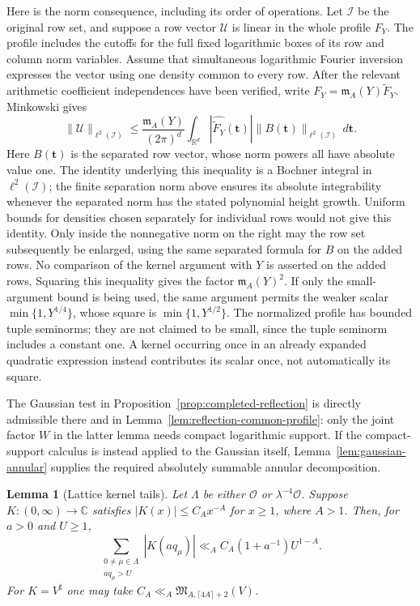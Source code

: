 \documentclass[11pt,a4paper]{article}
\numberwithin{equation}{section}
\numberwithin{figure}{section}
\newtheorem{lemma}[theorem]{Lemma}
\theoremstyle{definition}
\theoremstyle{remark}
\begin{document}
Here is the norm consequence, including its order of operations.  Let
$\mathcal I$ be the original row set, and suppose a row vector $\mathcal U$
is linear in the whole profile $F_Y$.  The profile includes the cutoffs for
the full fixed logarithmic boxes of its row and column norm variables.
Assume that simultaneous logarithmic Fourier inversion expresses the vector
using one density common to every row.  After the relevant arithmetic
coefficient independences have been verified, write
$F_Y=\mathfrak m_A(Y)\widetilde F_Y$.  Minkowski gives
\begin{equation}\label{eq:reflection-common-minkowski}
 \|\mathcal U\|_{\ell^2(\mathcal I)}
 \le \frac{\mathfrak m_A(Y)}{(2\pi)^d}
       \int_{\mathbb R^d}|\widehat{\widetilde F_Y}(\boldsymbol t)|
       \|B(\boldsymbol t)\|_{\ell^2(\mathcal I)}\,d\boldsymbol t.
\end{equation}
Here $B(\boldsymbol t)$ is the separated row vector, whose norm powers all
have absolute value one.  The identity underlying this inequality is a
Bochner integral in $\ell^2(\mathcal I)$; the finite separation norm above
ensures its absolute integrability whenever the separated norm has the stated
polynomial height growth.  Uniform bounds for densities chosen separately
for individual rows would not give this identity.
Only inside the nonnegative norm on the right may the row set subsequently
be enlarged, using the same separated formula for $B$ on the added rows.
No comparison of the kernel argument with $Y$ is asserted
on the added rows.  Squaring this inequality gives the factor
$\mathfrak m_A(Y)^2$.  If only the small-argument bound is being used, the
same argument permits the weaker scalar $\min\{1,Y^{1/4}\}$, whose square is
$\min\{1,Y^{1/2}\}$.  The normalized profile has bounded tuple seminorms;
they are not claimed to be small, since the tuple seminorm includes a constant
one.  A kernel occurring once in an already expanded quadratic expression
instead contributes its scalar once, not automatically its square.

The Gaussian test in Proposition~\ref{prop:completed-reflection} is directly
admissible there and in Lemma~\ref{lem:reflection-common-profile}: only the
joint factor $W$ in the latter lemma needs compact logarithmic support.  If
the compact-support calculus is instead applied to the Gaussian itself,
Lemma~\ref{lem:gaussian-annular} supplies the required absolutely summable
annular decomposition.

\begin{lemma}[Lattice kernel tails]\label{lem:lattice-kernel-tail}
Let $\Lambda$ be either $\mathcal O$ or $\lambda^{-4}\mathcal O$.  Suppose
$K:(0,\infty)\to\mathbb C$ satisfies $|K(x)|\le C_Ax^{-A}$ for $x\ge1$,
where $A>1$.  Then, for $a>0$ and $U\ge1$,
\begin{equation}\label{eq:lattice-kernel-tail}
 \sum_{\substack{0\ne\mu\in\Lambda\\a q_\mu>U}}|K(aq_\mu)|
 \ll_A C_A(1+a^{-1})U^{1-A}.
\end{equation}
For $K=V^\sharp$ one may take
$C_A\ll_A\mathfrak M_{A,\lceil4A\rceil+2}(V)$.
\end{lemma}
\end{document}
